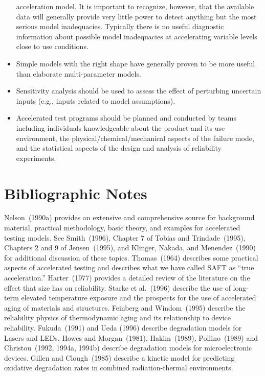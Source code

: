 \begin{itemize}
acceleration model.  It is important to recognize, however, that the
available data will generally provide very little power to detect
anything but the most serious model inadequacies. Typically there is
no useful diagnostic information about possible model inadequacies
at accelerating variable levels close to use conditions.
\item
Simple models with the right shape have generally proven to be more
useful than elaborate multi-parameter models.
\item
Sensitivity analysis should be used to assess the effect of perturbing
uncertain inputs (e.g., inputs related to model assumptions).
\item
Accelerated test programs should be planned and conducted by teams
including individuals knowledgeable about the product and its use
environment, the physical/chemical/mechanical aspects of the failure
mode, and the statistical aspects of the design and analysis of
reliability experiments.
\end{itemize}

\section*{Bibliographic Notes}
Nelson~(1990a) provides an extensive and comprehensive source for
background material, practical methodology, basic theory, and
examples for accelerated testing models. See Smith~(1996), Chapter 7
of Tobias and Trindade~(1995), Chapters 2 and 9 of Jensen~(1995),
and Klinger, Nakada, and Menendez~(1990) for additional discussion
of these topics.  Thomas~(1964) describes some practical aspects of
accelerated testing and describes what we have called SAFT as ``true
acceleration.'' Harter~(1977) provides a detailed review of the
literature on the effect that size has on reliability. Starke et
al.~(1996) describe the use of long-term elevated temperature
exposure and the prospects for the use of accelerated aging of
materials and structures.  Feinberg and Windom~(1995) describe the
reliability physics of thermodynamic aging and its relationship to
device reliability.  Fukuda~(1991) and Ueda (1996) describe
degradation models for Lasers and LEDs. Howes and Morgan~(1981),
Hakim~(1989), Pollino~(1989) and Christou~(1992, 1994a, 1994b)
describe degradation models for microelectronic devices. Gillen and
Clough~(1985) describe a kinetic model for predicting oxidative
degradation rates in combined radiation-thermal environments.

